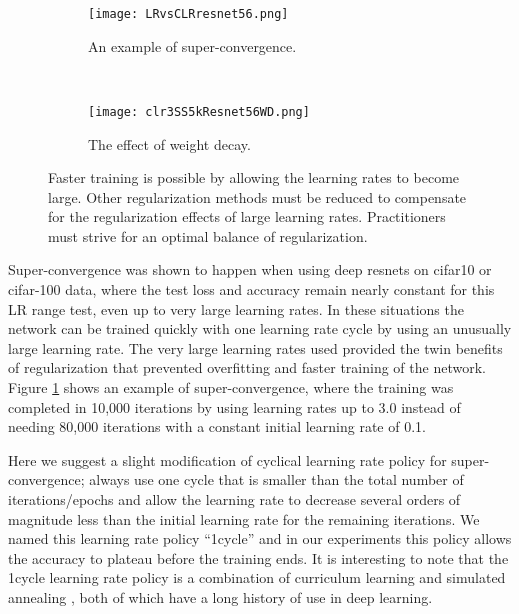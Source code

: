 \documentclass{article} %
\begin{document}
\begin{figure}[tbh]
	\centering
	\begin{subfigure}[b]{0.42\textwidth}
		\texttt{[image: LRvsCLRresnet56.png]}
		\caption{An example of super-convergence.}
		\label{fig:LRvsCLRresnet56}       %
	\end{subfigure}
	\quad
	\hfill
	~ %
	\centering
	\begin{subfigure}[b]{0.52\textwidth}
		\texttt{[image: clr3SS5kResnet56WD.png]}
		\caption{The effect of weight decay.}
		\label{fig:clr3SS5kResnet56WD}       %
	\end{subfigure}
	\caption{Faster training is possible by allowing the learning rates to become large.  Other regularization methods must be reduced to compensate for the regularization effects of large learning rates. Practitioners must strive for an optimal balance of regularization.}
	\label{fig:superConvergence}
	\vspace{-5pt}	
\end{figure}


Super-convergence \citep{smith2017super} was shown to happen when using deep resnets on cifar10 or cifar-100 data, where the test loss and accuracy remain nearly constant for this LR range test, even up to very large learning rates.  In these situations the  network can be trained quickly with one learning rate cycle by using an unusually large learning rate. The very large learning rates used provided the twin benefits of regularization that prevented overfitting and faster training of the network.  Figure \ref{fig:LRvsCLRresnet56} shows an example of super-convergence, where the training was completed in 10,000 iterations  by using learning rates up to 3.0 instead of needing 80,000 iterations with a constant initial learning rate of 0.1.  

Here we suggest a slight modification of cyclical learning rate policy for super-convergence; always use one cycle that is smaller than the total number of iterations/epochs and allow the learning rate to decrease several orders of magnitude less than the initial learning rate for the remaining iterations.  We named this learning rate policy ``1cycle'' and in our experiments this policy allows the accuracy to plateau before the training ends.  It is interesting to note that the 1cycle learning rate policy is a combination of curriculum learning  \citep{bengio2009curriculum} and simulated annealing \citep{aarts1988simulated}, both of which have a long history of use in deep learning.
\end{document}
